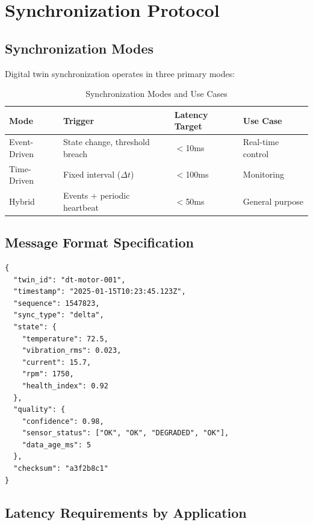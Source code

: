 \documentclass[12pt,a4paper]{article}
\begin{document}
\section{Synchronization Protocol}

\subsection{Synchronization Modes}

Digital twin synchronization operates in three primary modes:

\begin{table}[H]
\centering
\caption{Synchronization Modes and Use Cases}
\begin{tabular}{llll}
\toprule
\textbf{Mode} & \textbf{Trigger} & \textbf{Latency Target} & \textbf{Use Case} \\
\midrule
Event-Driven & State change, threshold breach & $<$10ms & Real-time control \\
Time-Driven & Fixed interval ($\Delta t$) & $<$100ms & Monitoring \\
Hybrid & Events + periodic heartbeat & $<$50ms & General purpose \\
\bottomrule
\end{tabular}
\end{table}

\subsection{Message Format Specification}

\begin{lstlisting}[caption=Digital Twin Synchronization Message (JSON)]
{
  "twin_id": "dt-motor-001",
  "timestamp": "2025-01-15T10:23:45.123Z",
  "sequence": 1547823,
  "sync_type": "delta",
  "state": {
    "temperature": 72.5,
    "vibration_rms": 0.023,
    "current": 15.7,
    "rpm": 1750,
    "health_index": 0.92
  },
  "quality": {
    "confidence": 0.98,
    "sensor_status": ["OK", "OK", "DEGRADED", "OK"],
    "data_age_ms": 5
  },
  "checksum": "a3f2b8c1"
}
\end{lstlisting}

\subsection{Latency Requirements by Application}
\end{document}
